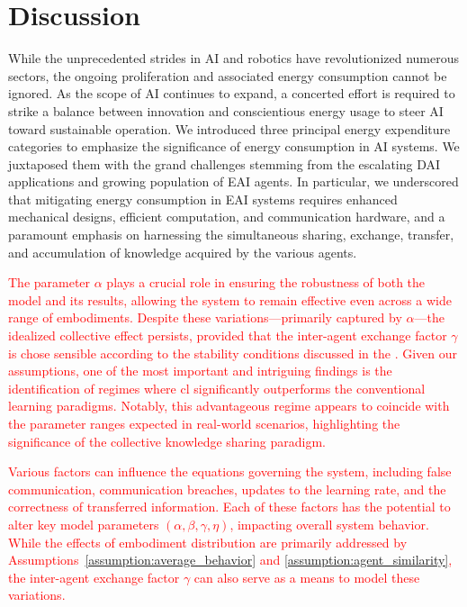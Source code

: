 \documentclass[12pt]{article}
\newcommand\myhl[1]{\textcolor{red}{#1}}
\begin{document}
\section*{Discussion}\label{sec:discussion}
While the unprecedented strides in AI and robotics have revolutionized numerous sectors, the ongoing proliferation and associated energy consumption cannot be ignored. As the scope of AI continues to expand, a concerted effort is required to strike a balance between innovation and conscientious energy usage to steer AI toward sustainable operation. We introduced three principal energy expenditure categories to emphasize the significance of energy consumption in AI systems. We juxtaposed them with the grand challenges stemming from the escalating DAI applications and growing population of EAI agents. In particular, we underscored that mitigating energy consumption in EAI systems requires enhanced mechanical designs, efficient computation, and communication hardware, and a paramount emphasis on harnessing the simultaneous sharing, exchange, transfer, and accumulation of knowledge acquired by the various agents.

\myhl{The parameter $\alpha$ plays a crucial role in ensuring the robustness of both the model and its results, allowing the system to remain effective even across a wide range of embodiments. Despite these variations---primarily captured by $\alpha$---the idealized collective effect persists, provided that the inter-agent exchange factor $\gamma$ is chose sensible according to the stability conditions discussed in the \nameref{sec:supplementary_materials}. Given our assumptions, one of the most important and intriguing findings is the identification of regimes where \ac{cl} significantly outperforms the conventional learning paradigms. Notably, this advantageous regime appears to coincide with the parameter ranges expected in real-world scenarios, highlighting the significance of the collective knowledge sharing paradigm.}

\myhl{Various factors can influence the equations governing the system, including false communication, communication breaches, updates to the learning rate, and the correctness of transferred information. Each of these factors has the potential to alter key model parameters $(\alpha,\beta,\gamma,\eta)$, impacting overall system behavior. While the effects of embodiment distribution are primarily addressed by Assumptions~\ref{assumption:average_behavior} and \ref{assumption:agent_similarity}, the inter-agent exchange factor $\gamma$ can also serve as a means to model these variations.}
\end{document}
